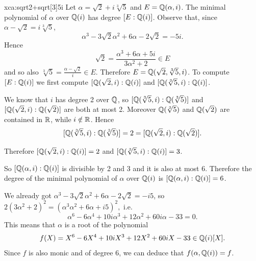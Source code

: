 \begin{sol}{xca:sqrt{2}+sqrt[3]{5}i}
    Let $\alpha=\sqrt{2}+i\sqrt[3]{5}$ and $E=\mathbb{Q}(\alpha,i)$. 
    The minimal polynomial of $\alpha$ over $\mathbb{Q}(i)$ has
    degree $[E:\mathbb{Q}(i)]$.
    Observe that, since $\alpha-\sqrt{2}=i\sqrt[3]{5}$,
    \[
    \alpha^3-3\sqrt{2}\alpha^2+6\alpha-2\sqrt{2}=-5i.
    \]
    Hence 
    \[
    \sqrt{2}=\frac{\alpha^3+6\alpha+5i}{3\alpha^2+2}\in E
    \]
    and so also $\sqrt[3]{5}=\frac{\alpha-\sqrt{2}}{i}\in E$. 
    Therefore $E=\mathbb{Q}(\sqrt{2},\sqrt[3]{5},i)$.
    To compute $[E:\mathbb{Q}(i)]$ we first compute $[\mathbb{Q}(\sqrt{2},i):\mathbb{Q}(i)]$
    and  $[\mathbb{Q}(\sqrt[3]{5},i):\mathbb{Q}(i)]$.
    
    We know that $i$ has degree 2 over $\mathbb{Q}$,
so $[\mathbb{Q}(\sqrt[3]{5},i):\mathbb{Q}(\sqrt[3]{5})]$ and 
$[\mathbb{Q}(\sqrt{2},i):\mathbb{Q}(\sqrt{2})]$ are both at most 2.
Moreover $\mathbb{Q}(\sqrt[3]{5})$ and $\mathbb{Q}(\sqrt{2})$ are contained in $\mathbb{R}$,
while $i\notin\mathbb{R}$.
Hence
\[
[\mathbb{Q}(\sqrt[3]{5},i):\mathbb{Q}(\sqrt[3]{5})]=2=[\mathbb{Q}(\sqrt{2},i):\mathbb{Q}(\sqrt{2})].
\]
\begin{center}
    \end{center}
Therefore $[\mathbb{Q}(\sqrt{2},i):\mathbb{Q}(i)]=2$
    and  $[\mathbb{Q}(\sqrt[3]{5},i):\mathbb{Q}(i)]=3$.
    \begin{center}
    \end{center}
So $[\mathbb{Q}(\alpha, i):\mathbb{Q}(i)]$ is divisible by 2 and 3 and it is also at most 6.
Therefore the degree of the minimal polynomial
of $\alpha$ over $\mathbb{Q}(i)$ is $[\mathbb{Q}(\alpha,i):\mathbb{Q}(i)]=6$.

We already got $\alpha^3-3\sqrt{2}\alpha^2+6\alpha-2\sqrt{2}=-i5$, 
so $2(3\alpha^2+2)^2=(\alpha^3\alpha^2+6\alpha+i5)^2,
$
i.e. 
\[
\alpha^6-6\alpha^4+10i\alpha^3+12\alpha^2+60i\alpha-33=0.
\]
This means that $\alpha$ is a root of the polynomial
\[
f(X)=X^6-6X^4+10iX^3+12X^2+60iX-33\in\mathbb{Q}(i)[X].
\]
Since $f$ is also monic and of degree 6, we can deduce that 
$f(\alpha,\mathbb{Q}(i))=f$.
\end{sol}

